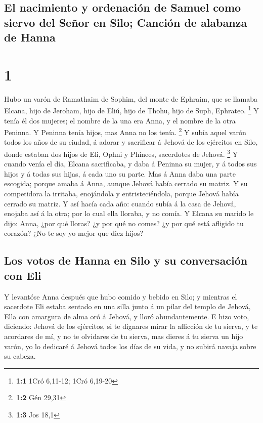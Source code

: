 \hypertarget{el-nacimiento-y-ordenaciuxf3n-de-samuel-como-siervo-del-seuxf1or-en-silo-canciuxf3n-de-alabanza-de-hanna}{%
\subsection{El nacimiento y ordenación de Samuel como siervo del Señor
en Silo; Canción de alabanza de
Hanna}\label{el-nacimiento-y-ordenaciuxf3n-de-samuel-como-siervo-del-seuxf1or-en-silo-canciuxf3n-de-alabanza-de-hanna}}

\hypertarget{section}{%
\section{1}\label{section}}

 Hubo un varón de Ramathaim de Sophim, del monte de Ephraim,
que se llamaba Elcana, hijo de Jeroham, hijo de Eliú, hijo de Thohu,
hijo de Suph, Ephrateo. \footnote{\textbf{1:1} 1Cró 6,11-12; 1Cró
  6,19-20}  Y tenía él dos mujeres; el nombre de la una era
Anna, y el nombre de la otra Peninna. Y Peninna tenía hijos, mas Anna no
los tenía. \footnote{\textbf{1:2} Gén 29,31}  Y subía aquel
varón todos los años de su ciudad, á adorar y sacrificar á Jehová de los
ejércitos en Silo, donde estaban dos hijos de Eli, Ophni y Phinees,
sacerdotes de Jehová. \footnote{\textbf{1:3} Jos 18,1}  Y
cuando venía el día, Elcana sacrificaba, y daba á Peninna su mujer, y á
todos sus hijos y á todas sus hijas, á cada uno su parte. 
Mas á Anna daba una parte escogida; porque amaba á Anna, aunque Jehová
había cerrado su matriz.  Y su competidora la irritaba,
enojándola y entristeciéndola, porque Jehová había cerrado su matriz.
 Y así hacía cada año: cuando subía á la casa de Jehová,
enojaba así á la otra; por lo cual ella lloraba, y no comía.
 Y Elcana su marido le dijo: Anna, ¿por qué lloras? ¿y por
qué no comes? ¿y por qué está afligido tu corazón? ¿No te soy yo mejor
que diez hijos?

\hypertarget{los-votos-de-hanna-en-silo-y-su-conversaciuxf3n-con-eli}{%
\subsection{Los votos de Hanna en Silo y su conversación con
Eli}\label{los-votos-de-hanna-en-silo-y-su-conversaciuxf3n-con-eli}}

 Y levantóse Anna después que hubo comido y bebido en Silo;
y mientras el sacerdote Eli estaba sentado en una silla junto á un pilar
del templo de Jehová,  Ella con amargura de alma oró á
Jehová, y lloró abundantemente.  E hizo voto, diciendo:
Jehová de los ejércitos, si te dignares mirar la aflicción de tu sierva,
y te acordares de mí, y no te olvidares de tu sierva, mas dieres á tu
sierva un hijo varón, yo lo dedicaré á Jehová todos los días de su vida,
y no subirá navaja sobre su cabeza.

